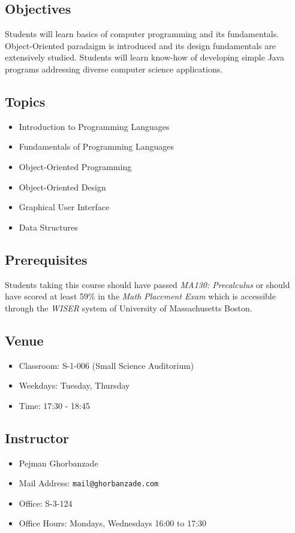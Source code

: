 \documentclass[12pt,letterpaper,twoside]{article}
\begin{document}


\subsection*{Objectives}
Students will learn basics of computer programming and its fundamentals. Object-Oriented paradaigm is introduced and its design fundamentals are extensively studied. Students will learn know-how of developing simple Java programs addressing diverse computer science applications.

\subsection*{Topics}
\begin{itemize}
\item[] Introduction to Programming Languages
\item[] Fundamentals of Programming Languages
\item[] Object-Oriented Programming
\item[] Object-Oriented Design
\item[] Graphical User Interface
\item[] Data Structures
\end{itemize}

\subsection*{Prerequisites}
Students taking this course should have passed \textit{MA130: Precalculus} or should have scored at least 59\% in the \textit{Math Placement Exam} which is accessible through the \textit{WISER} system of University of Massachusetts Boston.

\subsection*{Venue}
\begin{itemize}
\item[] Classroom: S-1-006 (Small Science Auditorium)
\item[] Weekdays: Tuesday, Thursday
\item[] Time: 17:30 - 18:45
\end{itemize}

\subsection*{Instructor}
\begin{itemize}
\item[] Pejman Ghorbanzade
\item[] Mail Address: \texttt{mail@ghorbanzade.com}
\item[] Office: S-3-124
\item[] Office Hours: Mondays, Wednesdays 16:00 to 17:30
\end{itemize}
\end{document}
